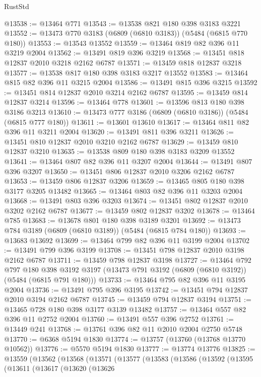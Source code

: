 \begin{lexlean}{RustStd}
\begin{coremodule}
@13538 := @13464 @771
@13543 := @13538 @821 @180 @398 @3183 @3221
@13552 := @13473 @770 @3183 (@6809 (@6810 @3183)) (@5484 (@6815 @770 @180))
@13553 := @13543 @13552
@13559 := @13464 @819 @82 @396 @11 @3219 @2004
@13562 := @13491 @819 @396 @3219
@13568 := @13451 @818 @12837 @2010 @3218 @2162 @6787
@13571 := @13459 @818 @12837 @3218
@13577 := @13538 @817 @180 @398 @3183 @3217 @13552
@13583 := @13464 @815 @82 @396 @11 @3215 @2004
@13586 := @13491 @815 @396 @3215
@13592 := @13451 @814 @12837 @2010 @3214 @2162 @6787
@13595 := @13459 @814 @12837 @3214
@13596 := @13464 @778
@13601 := @13596 @813 @180 @398 @3186 @3213
@13610 := @13473 @777 @3186 (@6809 (@6810 @3186)) (@5484 (@6815 @777 @180))
@13611 := @13601 @13610
@13617 := @13464 @811 @82 @396 @11 @3211 @2004
@13620 := @13491 @811 @396 @3211
@13626 := @13451 @810 @12837 @2010 @3210 @2162 @6787
@13629 := @13459 @810 @12837 @3210
@13635 := @13538 @809 @180 @398 @3183 @3209 @13552
@13641 := @13464 @807 @82 @396 @11 @3207 @2004
@13644 := @13491 @807 @396 @3207
@13650 := @13451 @806 @12837 @2010 @3206 @2162 @6787
@13653 := @13459 @806 @12837 @3206
@13659 := @13465 @805 @180 @398 @3177 @3205 @13482
@13665 := @13464 @803 @82 @396 @11 @3203 @2004
@13668 := @13491 @803 @396 @3203
@13674 := @13451 @802 @12837 @2010 @3202 @2162 @6787
@13677 := @13459 @802 @12837 @3202
@13678 := @13464 @785
@13683 := @13678 @801 @180 @398 @3189 @3201
@13692 := @13473 @784 @3189 (@6809 (@6810 @3189)) (@5484 (@6815 @784 @180))
@13693 := @13683 @13692
@13699 := @13464 @799 @82 @396 @11 @3199 @2004
@13702 := @13491 @799 @396 @3199
@13708 := @13451 @798 @12837 @2010 @3198 @2162 @6787
@13711 := @13459 @798 @12837 @3198
@13727 := @13464
    @792
    @797
    @180
    @398
    @3192
    @3197
    (@13473 @791 @3192 (@6809 (@6810 @3192)) (@5484 (@6815 @791 @180)))
@13733 := @13464 @795 @82 @396 @11 @3195 @2004
@13736 := @13491 @795 @396 @3195
@13742 := @13451 @794 @12837 @2010 @3194 @2162 @6787
@13745 := @13459 @794 @12837 @3194
@13751 := @13465 @728 @180 @398 @3177 @3139 @13482
@13757 := @13464 @557 @82 @396 @11 @2752 @2004
@13760 := @13491 @557 @396 @2752
@13761 := @13449 @241
@13768 := @13761 @396 @82 @11 @2010 @2004 @2750 @5748
@13770 := @6368 @5194 @1830
@13774 := @13757 (@13760 (@13768 @13770 @10562))
@13776 := @5570 @5194 @1830
@13777 := @13774 @13776
@13825 := @13559
    (@13562
      (@13568
        (@13571
          (@13577
            (@13583
              (@13586
                (@13592
                  (@13595
                    (@13611
                      (@13617
                        (@13620
                          (@13626

\end{coremodule}
\end{lexlean}
